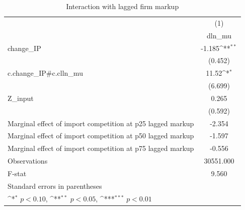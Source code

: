 \begin{table}[htbp]\centering
\def\sym#1{\ifmmode^{#1}\else\(^{#1}\)\fi}
\caption{Interaction with lagged firm markup}
\begin{tabular}{l*{1}{c}}
\hline\hline
            &\multicolumn{1}{c}{(1)}\\
            &\multicolumn{1}{c}{dln\_mu}\\
\hline
change\_IP   &      -1.185\sym{**} \\
            &     (0.452)         \\
[1em]
c.change\_IP#c.clln\_mu&       11.52\sym{*}  \\
            &     (6.699)         \\
[1em]
Z\_input     &       0.265         \\
            &     (0.592)         \\
\hline
Marginal effect of import competition at p25 lagged markup&      -2.354         \\
Marginal effect of import competition at p50 lagged markup&      -1.597         \\
Marginal effect of import competition at p75 lagged markup&      -0.556         \\
Observations&   30551.000         \\
F-stat      &       9.560         \\
\hline\hline
\multicolumn{2}{l}{\footnotesize Standard errors in parentheses}\\
\multicolumn{2}{l}{\footnotesize \sym{*} \(p<0.10\), \sym{**} \(p<0.05\), \sym{***} \(p<0.01\)}\\
\end{tabular}
\end{table}
